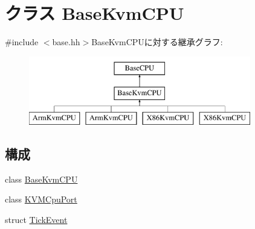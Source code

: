 \hypertarget{classBaseKvmCPU}{
\section{クラス BaseKvmCPU}
\label{classBaseKvmCPU}
}


{\ttfamily \#include $<$base.hh$>$}BaseKvmCPUに対する継承グラフ:\begin{figure}[H]
\begin{center}
\leavevmode
\includegraphics[height=3cm]{classBaseKvmCPU}
\end{center}
\end{figure}
\subsection*{構成}
\begin{DoxyCompactItemize}
\item 
class \hyperlink{classBaseKvmCPU_1_1BaseKvmCPU}{BaseKvmCPU}
\item 
class \hyperlink{classBaseKvmCPU_1_1KVMCpuPort}{KVMCpuPort}
\item 
struct \hyperlink{structBaseKvmCPU_1_1TickEvent}{TickEvent}
\end{DoxyCompactItemize}
